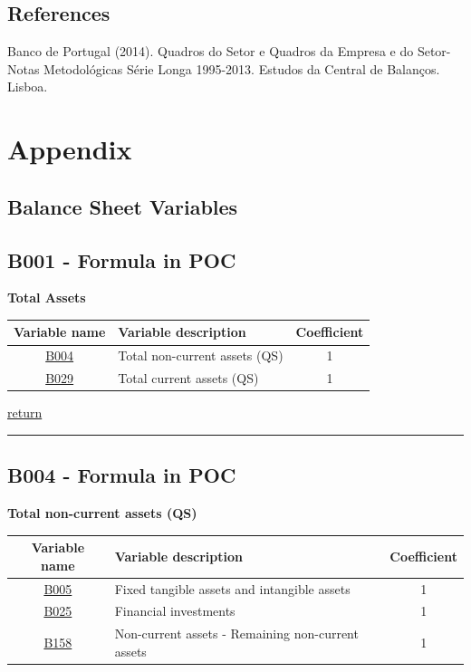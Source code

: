 \documentclass[]{book}
\begin{document}
\hypertarget{references}{%
\section{References}\label{references}}

Banco de Portugal (2014). Quadros do Setor e Quadros da Empresa e do Setor- Notas Metodológicas Série Longa 1995-2013. Estudos da Central de Balanços. Lisboa.

\hypertarget{appendix}{%
\chapter{Appendix}\label{appendix}}

\hypertarget{balance-sheet-variables}{%
\section{Balance Sheet Variables}\label{balance-sheet-variables}}

\hypertarget{b001---formula-in-poc}{%
\section{B001 - Formula in POC}\label{b001---formula-in-poc}}

\textbf{Total Assets}

\begin{longtable}[]{@{}clc@{}}
\toprule
Variable name & Variable description & Coefficient\tabularnewline
\midrule
\endhead
\protect\hyperlink{b004---formula-in-poc}{B004} & Total non-current assets (QS) & 1\tabularnewline
\protect\hyperlink{b029---formula-in-poc}{B029} & Total current assets (QS) & 1\tabularnewline
\bottomrule
\end{longtable}

\protect\hyperlink{assets}{return}

\begin{center}\rule{0.5\linewidth}{\linethickness}\end{center}

\hypertarget{b004---formula-in-poc}{%
\section{B004 - Formula in POC}\label{b004---formula-in-poc}}

\textbf{Total non-current assets (QS)}

\begin{longtable}[]{@{}clc@{}}
\toprule
Variable name & Variable description & Coefficient\tabularnewline
\midrule
\endhead
\protect\hyperlink{b005---formula-in-poc}{B005} & Fixed tangible assets and intangible assets & 1\tabularnewline
\protect\hyperlink{b025---formula-in-poc}{B025} & Financial investments & 1\tabularnewline
\protect\hyperlink{b158---formula-in-poc}{B158} & Non-current assets - Remaining non-current assets & 1\tabularnewline
\bottomrule
\end{longtable}
\end{document}
